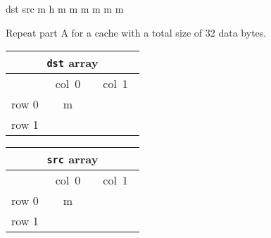 \begin{problem}{8}
\begin{subproblem}
{dst		src
m h		m m
m m		m m
}
\vspace{.2in}
\item Repeat part A for a cache with a total size of 32 data bytes.

\begin{minipage}[t]{2in}
\renewcommand{\arraystretch}{1.8}
\begin{tabular}{|c||c|c|}
\hline
\multicolumn{3}{|c|}{{\tt dst} array}\\
\hline
&\mbox{\ col 0\ }&\mbox{\ col 1\ }\\
\hline
\hline
row 0&m&\\
\hline
row 1&&\\
\hline
\end{tabular}
\end{minipage}
\begin{minipage}[t]{2in}
\renewcommand{\arraystretch}{1.8}
\begin{tabular}{|c||c|c|}
\hline
\multicolumn{3}{|c|}{{\tt src} array}\\
\hline
&\mbox{\ col 0\ }&\mbox{\ col 1\ }\\
\hline
\hline
row 0&m&\\
\hline
row 1&&\\
\hline
\end{tabular}
\end{minipage}
\end{subproblem}
\end{problem}